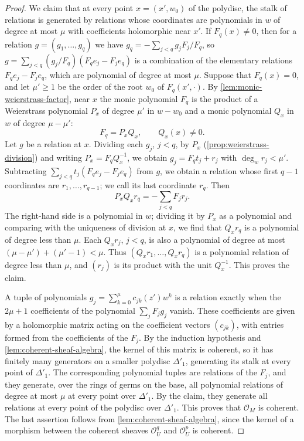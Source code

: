 \begin{proof}
We claim that at every point $x=(x',w_0)$ of the polydisc, the stalk of relations is generated by relations whose coordinates are polynomials in $w$ of degree at most $\mu$ with coefficients holomorphic near $x'$. If $F_q(x)\neq0$, then for a relation $g=(g_1,\ldots,g_q)$ we have $g_q=-\sum_{j<q}g_jF_j/F_q$, so $g=\sum_{j<q}(g_j/F_q)(F_qe_j-F_je_q)$ is a combination of the elementary relations $F_qe_j-F_je_q$, which are polynomial of degree at most $\mu$. Suppose that $F_q(x)=0$, and let $\mu'\geq1$ be the order of the root $w_0$ of $F_q(x',\cdot)$. By \cref{lem:monic-weierstrass-factor}, near $x$ the monic polynomial $F_q$ is the product of a Weierstrass polynomial $P_x$ of degree $\mu'$ in $w-w_0$ and a monic polynomial $Q_x$ in $w$ of degree $\mu-\mu'$:
\[
 F_q=P_xQ_x,\qquad Q_x(x)\neq0.
\]
Let $g$ be a relation at $x$. Dividing each $g_j$, $j<q$, by $P_x$ (\cref{prop:weierstrass-division}) and writing $P_x=F_qQ_x^{-1}$, we obtain $g_j=F_qt_j+r_j$ with $\deg_wr_j<\mu'$. Subtracting $\sum_{j<q}t_j(F_qe_j-F_je_q)$ from $g$, we obtain a relation whose first $q-1$ coordinates are $r_1,\ldots,r_{q-1}$; we call its last coordinate $r_q$. Then
\[
 P_xQ_xr_q=-\sum_{j<q}F_jr_j.
\]
The right-hand side is a polynomial in $w$; dividing it by $P_x$ as a polynomial and comparing with the uniqueness of division at $x$, we find that $Q_xr_q$ is a polynomial of degree less than $\mu$. Each $Q_xr_j$, $j<q$, is also a polynomial of degree at most $(\mu-\mu')+(\mu'-1)<\mu$. Thus $(Q_xr_1,\ldots,Q_xr_q)$ is a polynomial relation of degree less than $\mu$, and $(r_j)$ is its product with the unit $Q_x^{-1}$. This proves the claim.

A tuple of polynomials $g_j=\sum_{k=0}^{\mu}c_{jk}(z')w^k$ is a relation exactly when the $2\mu+1$ coefficients of the polynomial $\sum_jF_jg_j$ vanish. These coefficients are given by a holomorphic matrix acting on the coefficient vectors $(c_{jk})$, with entries formed from the coefficients of the $F_j$. By the induction hypothesis and \cref{lem:coherent-sheaf-algebra}, the kernel of this matrix is coherent, so it has finitely many generators on a smaller polydisc $\Delta'_1$, generating its stalk at every point of $\Delta'_1$. The corresponding polynomial tuples are relations of the $F_j$, and they generate, over the rings of germs on the base, all polynomial relations of degree at most $\mu$ at every point over $\Delta'_1$. By the claim, they generate all relations at every point of the polydisc over $\Delta'_1$. This proves that $\mathcal O_M$ is coherent. The last assertion follows from \cref{lem:coherent-sheaf-algebra}, since the kernel of a morphism between the coherent sheaves $\mathcal O_U^q$ and $\mathcal O_U^p$ is coherent.
\end{proof}

